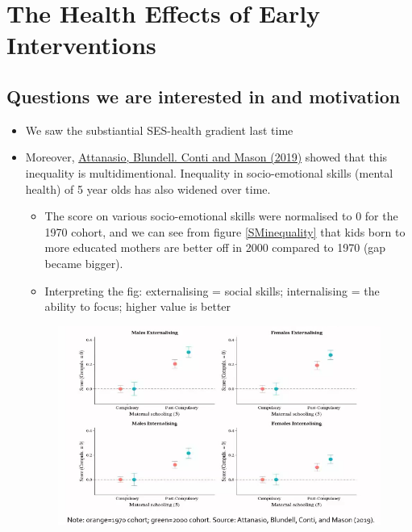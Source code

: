 \chapter{The Health Effects of Early Interventions}

 
\section{Questions we are interested in and motivation}

    \begin{itemize}
        \item We saw the substiantial SES-health gradient last time
        \item Moreover, \href{https://www.sciencedirect.com/science/article/pii/S0047272720300359}{Attanasio, Blundell. Conti and Mason (2019)} showed that this inequality is multidimentional. Inequality in socio-emotional skills (mental health) of 5 year olds has also widened over time.
        \begin{itemize}
            \item  The score on various socio-emotional skills were normalised to 0 for the 1970 cohort, and we can see from figure \ref{SMinequality} that kids born to more educated mothers are better off in 2000 compared to 1970 (gap became bigger).
            \item Interpreting the fig: externalising = social skills; internalising = the ability to focus; higher value is better
        \end{itemize}
        \begin{figure}[H]%
            \centering
            \includegraphics[width=13cm]{images/ch4/socioemotional inequality.png}

\end{figure}
\end{itemize}
